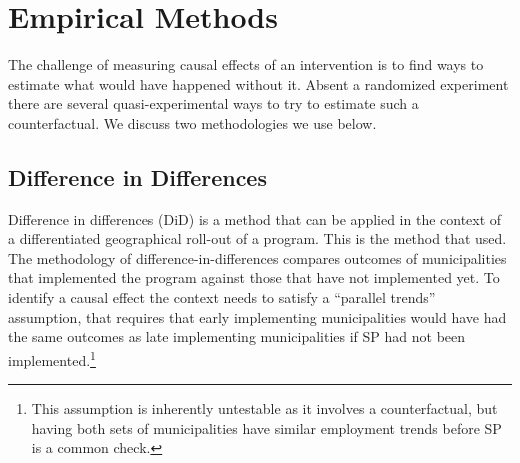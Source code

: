 \documentclass[oneside,11pt]{article}
\begin{document}
\newpage


\section{Empirical Methods} \label{Methods}

The challenge of measuring causal effects of an intervention is to find ways to estimate what would have happened without it. Absent a randomized experiment there are several quasi-experimental ways to try to estimate such a counterfactual. We discuss two methodologies we use below.

\subsection{Difference in Differences}

Difference in differences (DiD) is a method that can be applied in the context of a differentiated geographical roll-out of a program. This is the method that \cite{Campos} used. The methodology of difference-in-differences compares outcomes of municipalities that implemented the program against those that have not implemented yet. To identify a causal effect the context needs to satisfy a ``parallel trends'' assumption, that requires that early implementing municipalities would have had the same outcomes as late implementing municipalities if SP had not been implemented.\footnote{This assumption is inherently untestable as it involves a counterfactual, but having both sets of municipalities have similar employment trends before SP is a common check.}  
\end{document}
